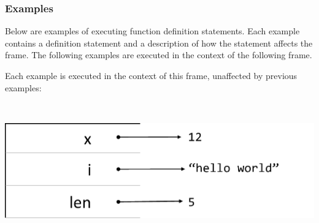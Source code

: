 \documentclass{article}
\newcommand{\pretabularspace}{\ifhevea\else \strut \\ \strut \fi}
\newcommand{\posttabularspace}{\ifhevea\else \strut \\ \strut \fi}
\begin{document}
\subsubsection{Examples}

Below are examples of executing function definition statements.  Each
example contains a definition statement and a description of how the
statement affects the frame.  The following examples are executed in the
context of the following frame.

Each example is executed in the context of this frame, unaffected by previous examples:

  \pretabularspace
  \includegraphics{diagrams/bindings-3}
  \posttabularspace
\end{document}
